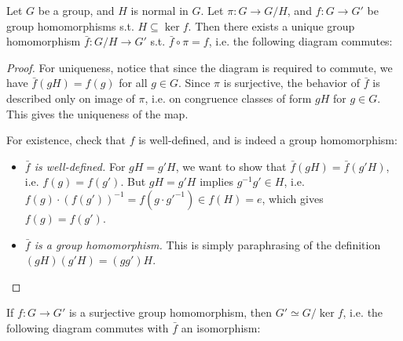 \begin{proposition}\label{prop: universal property of quotient group}
    Let $G$ be a group, and $H$ is normal in $G$. Let $\pi: G \to G/H$, and $f: G \to G'$ be group homomorphisms s.t. $H \subseteq \ker f$. Then there exists a unique group homomorphism $\bar{f} : G/H \to G'$ s.t. $\bar{f} \circ \pi = f$, i.e. the following diagram commutes:

    \begin{minipage}{\linewidth}
        \centering
    \end{minipage}
\end{proposition}

\begin{proof}
    For uniqueness, notice that since the diagram is required to commute, we have $\bar{f} (gH) = f(g)$ for all $g \in G$. Since $\pi$ is surjective, the behavior of $\bar{f}$ is described only on image of $\pi$, i.e. on congruence classes of form $gH$ for $g \in G$. This gives the uniqueness of the map.
    
    For existence, check that $f$ is well-defined, and is indeed a group homomorphism:
    \begin{itemize}
        \item \emph{$\bar{f}$ is well-defined.} For $gH = g'H$, we want to show that $\bar{f}(gH) = \bar{f}(g'H)$, i.e. $f(g) = f(g')$. But $gH = g'H$ implies $g^{-1}g' \in H$, i.e. $f(g) \cdot (f(g'))^{-1} = f(g\cdot {g'}^{-1}) \in f(H) = e$, which gives $f(g) = f(g')$.
        \item \emph{$\bar{f}$ is a group homomorphism.} This is simply paraphrasing of the definition $(gH)(g'H) = (gg')H$.
    \end{itemize}
\end{proof}

\begin{theorem} \label{thm: first isomorphism theorem}
    If $f: G \to G'$ is a surjective group homomorphism, then $G' \simeq G / \ker f$, i.e. the following diagram commutes with $\bar{f}$ an isomorphism:

    \begin{minipage}{\linewidth}
        \centering
    \end{minipage}
\end{theorem}

